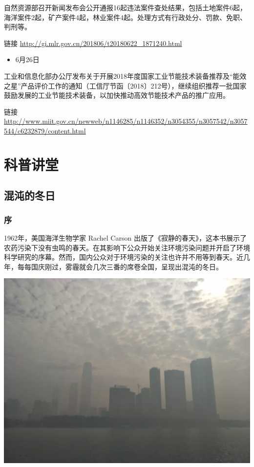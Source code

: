 \documentclass[]{book}
\providecommand{\tightlist}{%
  \setlength{\itemsep}{0pt}\setlength{\parskip}{0pt}}
\begin{document}
自然资源部召开新闻发布会公开通报16起违法案件查处结果，包括土地案件6起，海洋案件2起，矿产案件4起，林业案件4起。处理方式有行政处分、罚款、免职、判刑等。

链接 \url{http://gi.mlr.gov.cn/201806/t20180622_1871240.html}

\begin{itemize}
\tightlist
\item
  6月26日
\end{itemize}

工业和信息化部办公厅发布关于开展2018年度国家工业节能技术装备推荐及``能效之星''产品评价工作的通知（工信厅节函〔2018〕212号），继续组织推荐一批国家鼓励发展的工业节能技术装备，以加快推动高效节能技术产品的推广应用。

链接
\url{http://www.miit.gov.cn/newweb/n1146285/n1146352/n3054355/n3057542/n3057544/c6232879/content.html}

\chapter{科普讲堂}

\section{混沌的冬日}

\subsection{序}

1962年，美国海洋生物学家 Rachel Carson
出版了《寂静的春天》，这本书展示了农药污染下没有虫鸣的春天。在其影响下公众开始关注环境污染问题并开启了环境科学研究的序幕。然而，国内公众对于环境污染的关注也许并不用等到春天。近几年，每每国庆刚过，雾霾就会几次三番的席卷全国，呈现出混沌的冬日。

\includegraphics[width=6.67in]{images/cw1}
\end{document}
